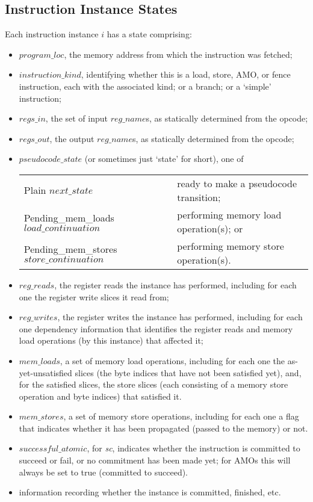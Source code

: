 \subsection{Instruction Instance States}\label{sec:omm:inst_state}
Each instruction instance $i$ has a state comprising:
\begin{itemize}
\item $program\_loc$, the memory address from which the instruction was fetched;
\item $instruction\_kind$, identifying whether this is a load, store, AMO, or fence instruction, each with the associated kind; or a branch; or a `simple' instruction;
\item $regs\_in$, the set of input $reg\_name$s, as statically determined from the opcode;
\item $regs\_out$, the output $reg\_name$s, as statically determined from the opcode;
\item $pseudocode\_state$ (or sometimes just `state' for short), one of
  \begin{center}
  \begin{tabular}{l@{ - }l}
  {\sc Plain} $next\_state$                        & ready to make a pseudocode transition; \\
  {\sc Pending\_mem\_loads} $load\_continuation$   & performing memory load operation(s); or \\
  {\sc Pending\_mem\_stores} $store\_continuation$ & performing memory store operation(s). \\
  \end{tabular}
  \end{center}
\item $reg\_reads$, the register reads the instance has performed, including for each one the register write slices it read from;
\item $reg\_writes$, the register writes the instance has performed, including for each one dependency information that identifies the register reads and memory load operations (by this instance) that affected it;
\item $mem\_loads$, a set of memory load operations, including for each one the as-yet-unsatisfied slices (the byte indices that have not been satisfied yet), and, for the satisfied slices, the store slices (each consisting of a memory store operation and byte indices) that satisfied it.
\item $mem\_stores$, a set of memory store operations, including for each one a flag that indicates whether it has been propagated (passed to the memory) or not.
\item $successful\_atomic$, for {\em sc}, indicates whether the instruction is committed to succeed or fail, or no commitment has been made yet; for AMOs this will always be set to true (committed to succeed).
\item information recording whether the instance is committed, finished, etc.
\end{itemize}

